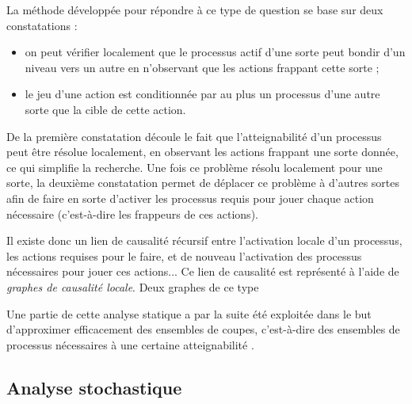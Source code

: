 La méthode développée pour répondre à ce type de question
se base sur deux constatations :
\begin{itemize}
  \item on peut vérifier localement que le processus actif d'une sorte peut
    bondir d'un niveau vers un autre en n'observant que les actions frappant cette sorte ;
  \item le jeu d'une action est conditionnée par au plus un processus d'une autre sorte
    que la cible de cette action.
\end{itemize}
De la première constatation découle le fait que l'atteignabilité d'un processus
peut être résolue localement, en observant les actions frappant une sorte donnée,
ce qui simplifie la recherche.
Une fois ce problème résolu localement pour une sorte, 
la deuxième constatation permet de déplacer ce problème
à d'autres sortes afin de faire en sorte d'activer les processus requis
pour jouer chaque action nécessaire (c'est-à-dire les frappeurs de ces actions).

Il existe donc un lien de causalité récursif entre l'activation locale d'un processus,
les actions requises pour le faire, et de nouveau l'activation des processus
nécessaires pour jouer ces actions...
Ce lien de causalité est représenté à l'aide de \emph{graphes de causalité locale}.
Deux graphes de ce type 


\TODO




Une partie de cette analyse statique a par la suite été
exploitée dans le but d'approximer efficacement des ensembles de coupes,
c'est-à-dire des ensembles de processus nécessaires à une certaine atteignabilité
\cite{PAK13-CAV}.



\subsection{Analyse stochastique}


\newcommand{\stochainf}{{\small $\infty$}}
\newcommand{\stochaa}{$\mathbf{a}$}
\newcommand{\stochab}{$\mathbf{b}$}
\newcommand{\stochac}{$\mathbf{c}$}

